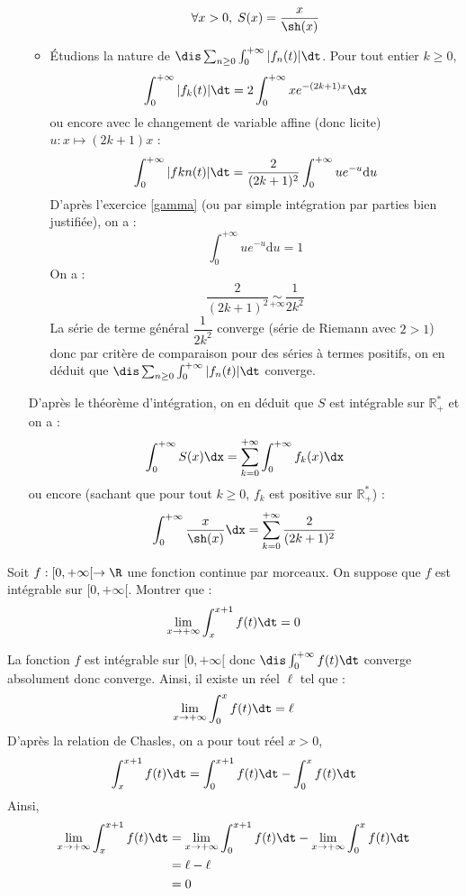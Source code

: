 \documentclass[a4paper,10pt]{report}
\begin{document}
\begin{enumerate}
\begin{itemize}
$$ \forall x >0, \; S(x) = \dfrac{x}{\sh(x)}$$
\item Étudions la nature de $\dis \sum_{n \geq 0} \int_{0}^{+ \infty} \vert f_n(t) \vert \dt$. Pour tout entier $k \geq 0$,
$$ \int_0^{+ \infty} \vert f_k(t) \vert \dt = 2 \int_0^{+\infty} x e^{-(2k+1)x} \dx$$
ou encore avec le changement de variable affine (donc licite) $u : x \mapsto (2k+1)x$ :
$$  \int_0^{+ \infty} \vert fkn(t) \vert \dt = \dfrac{2}{(2k+1)^2} \int_0^{+\infty} u e^{-u} \textrm{d}u$$
D'après l'exercice \ref{gamma} (ou par simple intégration par parties bien justifiée), on a :
$$ \int_0^{+\infty} u e^{-u} \textrm{d}u = 1$$
On a :
$$ \dfrac{2}{(2k+1)^2} \underset{+ \infty}{\sim} \dfrac{1}{2k^2}$$
La série de terme général $\dfrac{1}{2k^2}$ converge (série de Riemann avec $2>1$) donc par critère de comparaison pour des séries à termes positifs, on en déduit que $\dis \sum_{n \geq 0} \int_{0}^{+ \infty} \vert f_n(t) \vert \dt$ converge.
\end{itemize}
D'après le théorème d'intégration, on en déduit que $S$ est intégrable sur $\mathbb{R}_+^*$ et on a :
$$ \int_0^{+ \infty} S(x) \dx = \sum_{k=0}^{+ \infty} \int_0^{+ \infty} f_k(x) \dx$$
ou encore (sachant que pour tout $k \geq 0$, $f_k$ est positive sur $\mathbb{R}_+^*$) :
$$ \int_0^{+ \infty} \dfrac{x}{\sh(x)} \dx = \sum_{k=0}^{+ \infty} \dfrac{2}{(2k+1)^2}$$
\end{enumerate}

\begin{Exercice}{}  Soit $f :[0, + \infty[ \rightarrow \R$ une fonction continue par morceaux.  On suppose que $f$ est intégrable sur $[0, + \infty[$.  Montrer que :
  \[
  \lim_{x \rightarrow + \infty} \int_{x}^{x + 1} f(t) \dt =0 
  \]
\end{Exercice}

\corr La fonction $f$ est intégrable sur $[0, + \infty[$ donc $\dis \int_0^{+ \infty} f(t) \dt$ converge absolument donc converge. Ainsi, il existe un réel $\ell$ tel que :
$$ \lim_{x \rightarrow + \infty} \int_0^x f(t) \dt = \ell$$
D'après la relation de Chasles, on a pour tout réel $x>0$,
$$ \int_{x}^{x + 1} f(t) \dt = \int_{0}^{x + 1} f(t) \dt - \int_{0}^{x} f(t) \dt $$
Ainsi,
\begin{align*}
\lim_{x \rightarrow + \infty} \int_{x}^{x + 1} f(t) \dt & =\lim_{x \rightarrow + \infty}  \int_{0}^{x + 1} f(t) \dt - \lim_{x \rightarrow + \infty} \int_{0}^{x} f(t) \dt \\
& = \ell - \ell \\
& = 0
\end{align*}
\end{document}
